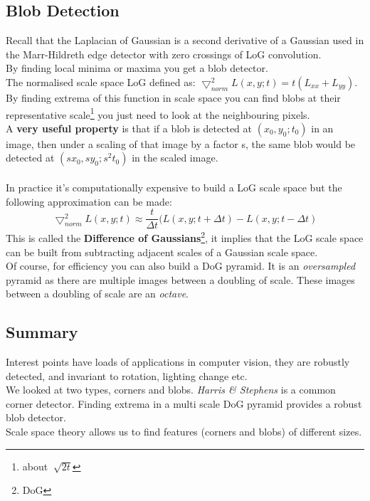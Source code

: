 \documentclass{article}
\begin{document}
	\subsection{Blob Detection}
	Recall that the Laplacian of Gaussian is a second derivative of a Gaussian used in the Marr-Hildreth edge detector with zero crossings of LoG convolution.\\
	By finding local minima or maxima you get a blob detector.\\
	The normalised scale space LoG defined as: $\bigtriangledown^2_{norm}L(x,y;t)=t(L_{xx}+L_{yy})$. By finding extrema of this function in scale space you can find blobs at their representative scale\footnote{about $~\sqrt{2t}$} you just need to look at the neighbouring pixels.\\
	A \textbf{very useful property} is that if a blob is detected at $(x_0,y_0;t_0)$ in an image, then under a scaling of that image by a factor s, the same blob would be detected at $(sx_0,sy_0;s^2t_0)$ in the scaled image.\\
	\\
	In practice it's computationally expensive to build a LoG scale space but the following approximation can be made:
	$$\bigtriangledown^2_{norm}L(x,y;t)\approx\frac{t}{\Delta t}(L(x,y;t+\Delta t)-L(x,y;t-\Delta t)$$
	This is called the \textbf{Difference of Gaussians}\footnote{DoG}, it implies that the LoG scale space can be built from subtracting adjacent scales of a Gaussian scale space.\\
	Of course, for efficiency you can also build a DoG pyramid. It is an \textit{oversampled} pyramid as there are multiple images between a doubling of scale. These images between a doubling of scale are an \textit{octave}.
	\subsection{Summary}
	Interest points have loads of applications in computer vision, they are robustly detected, and invariant to rotation, lighting change etc.\\
	We looked at two types, corners and blobs. \textit{Harris \& Stephens} is a common corner detector. Finding extrema in a multi scale DoG pyramid provides a robust blob detector.\\
	Scale space theory allows us to find features (corners and blobs) of different sizes.
	
\end{document}
